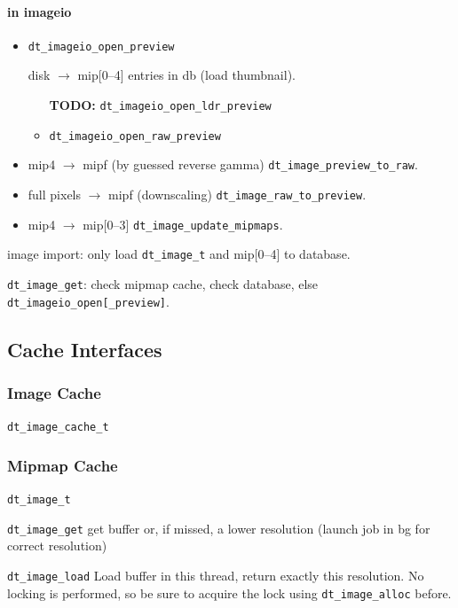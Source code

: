 \documentclass[a4paper,twoside]{scrartcl}
\newcommand{\todo}[1]{{\color{red}\bf TODO: #1}}
\newcommand{\code}[1]{\texttt{\color{codecol}#1}}
\begin{document}
\paragraph{in imageio}
\begin{itemize}
  \item \code{dt\_imageio\_open\_preview}

    disk $\rightarrow$ mip[0--4] entries in db (load thumbnail).
    \begin{itemize}
      \item[\todo{}]  \code{dt\_imageio\_open\_ldr\_preview}
      \item \code{dt\_imageio\_open\_raw\_preview}
    \end{itemize}
  \item mip4 $\rightarrow$ mipf (by guessed reverse gamma) \code{dt\_image\_preview\_to\_raw}.
  \item full pixels $\rightarrow$ mipf (downscaling) \code{dt\_image\_raw\_to\_preview}.
  \item mip4 $\rightarrow$ mip[0--3] \code{dt\_image\_update\_mipmaps}.
\end{itemize}

image import: only load \code{dt\_image\_t} and mip[0--4] to database.

\code{dt\_image\_get}: check mipmap cache, check database, else \code{dt\_imageio\_open[\_preview]}.

\subsection{Cache Interfaces}

\subsubsection{Image Cache}

\code{dt\_image\_cache\_t}

\subsubsection{Mipmap Cache}

\code{dt\_image\_t}

\begin{description}
  \item{\code{dt\_image\_get}} get buffer or, if missed, a lower resolution (launch job in bg for correct resolution)
  \item{\code{dt\_image\_load}} Load buffer in this thread, return exactly this resolution.
    No locking is performed, so be sure to acquire the lock using \code{dt\_image\_alloc} before.
\end{description}
\end{document}
